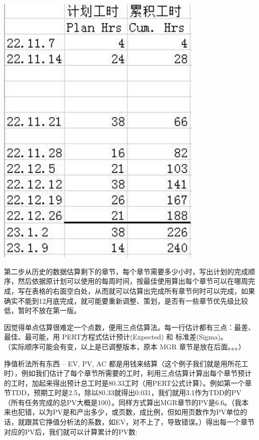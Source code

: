 
\includegraphics[width=10cm]{psp3.jpg}

第二步从历史的数据估算剩下的章节，每个章节需要多少小时，写出计划的完成顺序，然后依据原计划可以使用的每周时间，按最佳使用算出每个章节可以在哪周完成，写在表格的右面空白处，从而就可以估算出完成所有章节何时可以完成，如果确实不能到12月底完成，就可能要重新调整、策划，是否有一些章节优先级比较低，暂时不放在第一版。

因觉得单点估算很难定一个点数，便用三点估算法。每一行估计都有三点：最差、最佳、最可能，用
PERT方程式估计预计(Expected) 和 标准差(Sigma)。\\
（实际顺序可能会有变，以上是已调整版本，原本 MGR 章节是放在后面。。。）

挣值析法所有东西 -- EV, PV, AC
都是用钱来结算（这个例子我们就是用所花工时），例如我们估计了每个章节所需要的工时，利用三点估算计算出每个章节预计的工时，加起来得出预计总工时是80.33工时（用PERT公式计算）。例如第一个章节TDD，预期工时是2.5，除以80.33就得出0.031，我们就用3.1作为TDD的PV（所有任务完成的总PV大概是100）。同样方式算出MGR章节的PV是6.6。（我本来也犯错，以为PV是和产出多少，或页数，成比例，但如用页数作为PV单位的话，就跟其它挣值分析法的系数，如EV，对不上了，导致错误。）得出每一个章节对应的PV后，我们就可以计算累计的PV数:


